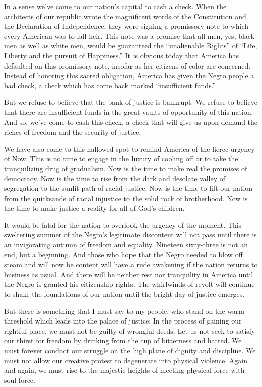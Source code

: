 \documentclass[a4paper]{amsbook}
\begin{document}
In a sense we've come to our nation's capital to cash a check. When the architects of our republic wrote the magnificent words of the Constitution and the Declaration of Independence, they were signing a promissory note to which every American was to fall heir. This note was a promise that all men, yes, black men as well as white men, would be guaranteed the “unalienable Rights” of “Life, Liberty and the pursuit of Happiness.” It is obvious today that America has defaulted on this promissory note, insofar as her citizens of color are concerned. Instead of honoring this sacred obligation, America has given the Negro people a bad check, a check which has come back marked “insufficient funds.”

But we refuse to believe that the bank of justice is bankrupt. We refuse to believe that there are insufficient funds in the great vaults of opportunity of this nation. And so, we've come to cash this check, a check that will give us upon demand the riches of freedom and the security of justice.

We have also come to this hallowed spot to remind America of the fierce urgency of Now. This is no time to engage in the luxury of cooling off or to take the tranquilizing drug of gradualism. Now is the time to make real the promises of democracy. Now is the time to rise from the dark and desolate valley of segregation to the sunlit path of racial justice. Now is the time to lift our nation from the quicksands of racial injustice to the solid rock of brotherhood. Now is the time to make justice a reality for all of God's children.

It would be fatal for the nation to overlook the urgency of the moment. This sweltering summer of the Negro's legitimate discontent will not pass until there is an invigorating autumn of freedom and equality. Nineteen sixty-three is not an end, but a beginning. And those who hope that the Negro needed to blow off steam and will now be content will have a rude awakening if the nation returns to business as usual. And there will be neither rest nor tranquility in America until the Negro is granted his citizenship rights. The whirlwinds of revolt will continue to shake the foundations of our nation until the bright day of justice emerges.

But there is something that I must say to my people, who stand on the warm threshold which leads into the palace of justice: In the process of gaining our rightful place, we must not be guilty of wrongful deeds. Let us not seek to satisfy our thirst for freedom by drinking from the cup of bitterness and hatred. We must forever conduct our struggle on the high plane of dignity and discipline. We must not allow our creative protest to degenerate into physical violence. Again and again, we must rise to the majestic heights of meeting physical force with soul force.
\end{document}
